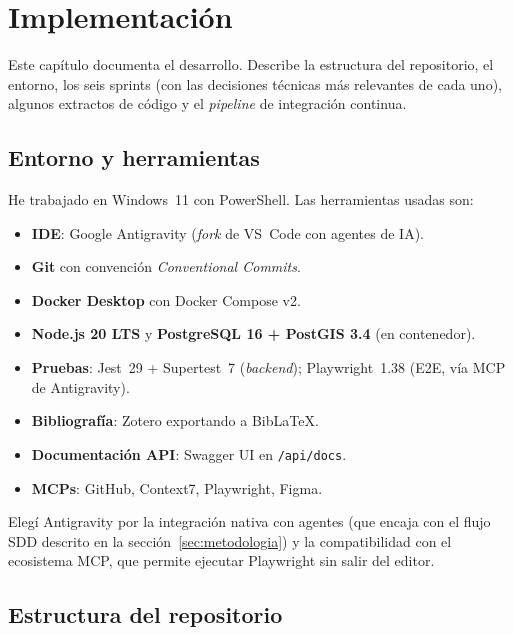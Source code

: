 \chapter{Implementación}
\label{ch:implementacion}

Este capítulo documenta el desarrollo. Describe la estructura del repositorio, el entorno, los seis sprints (con las decisiones técnicas más relevantes de cada uno), algunos extractos de código y el \textit{pipeline} de integración continua.


\section{Entorno y herramientas}
\label{sec:entorno}

He trabajado en Windows~11 con PowerShell. Las herramientas usadas son:

\begin{itemize}[leftmargin=1.2cm, itemsep=2pt]
  \item \textbf{IDE}: Google Antigravity (\textit{fork} de VS~Code con agentes de IA).
  \item \textbf{Git} con convención \textit{Conventional Commits}.
  \item \textbf{Docker Desktop} con Docker Compose v2.
  \item \textbf{Node.js 20 LTS} y \textbf{PostgreSQL 16 + PostGIS 3.4} (en contenedor).
  \item \textbf{Pruebas}: Jest~29 + Supertest~7 (\textit{backend}); Playwright~1.38 (E2E, vía MCP de Antigravity).
  \item \textbf{Bibliografía}: Zotero exportando a BibLaTeX.
  \item \textbf{Documentación API}: Swagger UI en \texttt{/api/docs}.
  \item \textbf{MCPs}: GitHub, Context7, Playwright, Figma.
\end{itemize}

Elegí Antigravity por la integración nativa con agentes (que encaja con el flujo SDD descrito en la sección~\ref{sec:metodologia}) y la compatibilidad con el ecosistema MCP, que permite ejecutar Playwright sin salir del editor.


\section{Estructura del repositorio}
\label{sec:estructura-repo}

